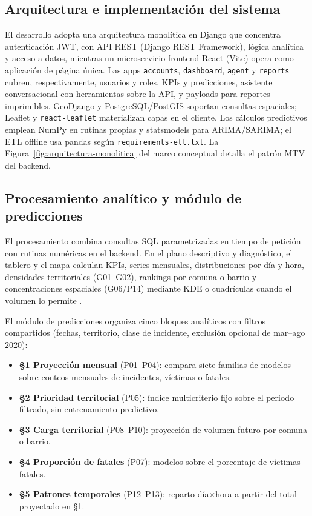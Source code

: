 \subsection{Arquitectura e implementación del sistema}

El desarrollo adopta una arquitectura monolítica en Django que concentra autenticación JWT, con API REST (Django REST Framework), lógica analítica y acceso a datos, mientras un microservicio frontend React (Vite) opera como aplicación de página única. Las apps \texttt{accounts}, \texttt{dashboard}, \texttt{agent} y \texttt{reports} cubren, respectivamente, usuarios y roles, KPIs y predicciones, asistente conversacional con herramientas sobre la API, y payloads para reportes imprimibles. GeoDjango y PostgreSQL/PostGIS soportan consultas espaciales; Leaflet y \texttt{react-leaflet} materializan capas en el cliente. Los cálculos predictivos emplean NumPy en rutinas propias y statsmodels para ARIMA/SARIMA; el ETL offline usa pandas según \texttt{requirements-etl.txt}. La Figura~\ref{fig:arquitectura-monolitica} del marco conceptual detalla el patrón MTV del backend.

\subsection{Procesamiento analítico y módulo de predicciones}

El procesamiento combina consultas SQL parametrizadas en tiempo de petición con rutinas numéricas en el backend. En el plano descriptivo y diagnóstico, el tablero y el mapa calculan KPIs, series mensuales, distribuciones por día y hora, densidades territoriales (G01--G02), rankings por comuna o barrio y concentraciones espaciales (G06/P14) mediante KDE o cuadrículas cuando el volumen lo permite \cite{xu2022,monar2025}.

El módulo de predicciones organiza cinco bloques analíticos con filtros compartidos (fechas, territorio, clase de incidente, exclusión opcional de mar–ago 2020):

\begin{itemize}
	\item \textbf{§1 Proyección mensual} (P01--P04): compara siete familias de modelos sobre conteos mensuales de incidentes, víctimas o fatales.
	\item \textbf{§2 Prioridad territorial} (P05): índice multicriterio fijo sobre el periodo filtrado, sin entrenamiento predictivo.
	\item \textbf{§3 Carga territorial} (P08--P10): proyección de volumen futuro por comuna o barrio.
	\item \textbf{§4 Proporción de fatales} (P07): modelos sobre el porcentaje de víctimas fatales.
	\item \textbf{§5 Patrones temporales} (P12--P13): reparto día$\times$hora a partir del total proyectado en §1.
\end{itemize}

